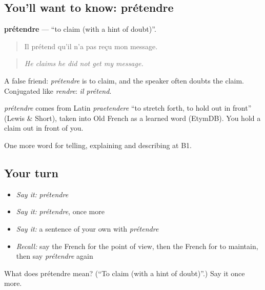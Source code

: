 \subsection*{You'll want to know: prétendre}
\textbf{prétendre} — \textquotedblleft{}to claim (with a hint of doubt)\textquotedblright{}.

\begin{quote}
Il prétend qu'il n'a pas reçu mon message.
\end{quote}

\begin{quote}
\emph{He claims he did not get my message.}
\end{quote}

A false friend: \emph{prétendre} is to claim, and the speaker often doubts the claim. Conjugated like \emph{rendre}: \emph{il prétend}.

\begin{cousinweb}
\emph{prétendre} comes from Latin \emph{praetendere} \textquotedblleft{}to stretch forth, to hold out in front\textquotedblright{} (Lewis \& Short), taken into Old French as a learned word (EtymDB). You hold a claim out in front of you.
\end{cousinweb}

\begin{grammarlens}[title={What you've built}]
One more word for telling, explaining and describing at B1.
\end{grammarlens}

\subsection*{Your turn}
\begin{itemize}
\raggedright
  \item \emph{Say it:} \emph{prétendre}
  \item \emph{Say it:} \emph{prétendre}, once more
  \item \emph{Say it:} a sentence of your own with \emph{prétendre}
  \item \emph{Recall:} say the French for the point of view, then the French for to maintain, then say \emph{prétendre} again
\end{itemize}

\begin{tcolorbox}[breakable,colback=teal!4,colframe=teal!35!black,title={Before you move on}]
What does prétendre mean? (\textquotedblleft{}To claim (with a hint of doubt)\textquotedblright{}.) Say it once more.
\end{tcolorbox}
